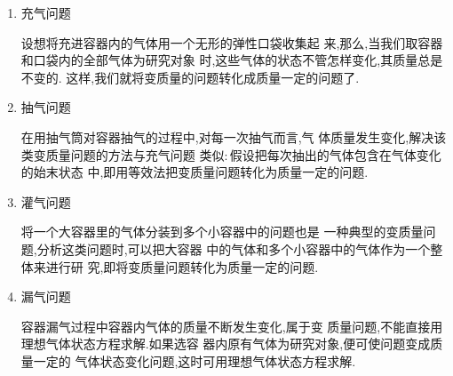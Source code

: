 \begin{enumerate}
\renewcommand{\labelenumi}{\arabic{enumi}.}
\item
充气问题

设想将充进容器内的气体用一个无形的弹性口袋收集起
来,那么,当我们取容器和口袋内的全部气体为研究对象
时,这些气体的状态不管怎样变化,其质量总是不变的.
这样,我们就将变质量的问题转化成质量一定的问题了.


\item
抽气问题

在用抽气筒对容器抽气的过程中,对每一次抽气而言,气
体质量发生变化,解决该类变质量问题的方法与充气问题
类似$ : $假设把每次抽出的气体包含在气体变化的始末状态
中,即用等效法把变质量问题转化为质量一定的问题.


\item
灌气问题

将一个大容器里的气体分装到多个小容器中的问题也是
一种典型的变质量问题,分析这类问题时,可以把大容器
中的气体和多个小容器中的气体作为一个整体来进行研
究,即将变质量问题转化为质量一定的问题.



\item
漏气问题

容器漏气过程中容器内气体的质量不断发生变化,属于变
质量问题,不能直接用理想气体状态方程求解.如果选容
器内原有气体为研究对象,便可使问题变成质量一定的
气体状态变化问题,这时可用理想气体状态方程求解.


\end{enumerate}


